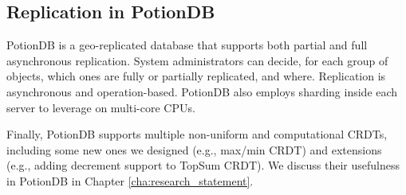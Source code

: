\subsection{Replication in PotionDB}

PotionDB is a geo-replicated database that supports both partial and full asynchronous replication.
System administrators can decide, for each group of objects, which ones are fully or partially replicated, and where.
Replication is asynchronous and operation-based.
PotionDB also employs sharding inside each server to leverage on multi-core CPUs.

Finally, PotionDB supports multiple non-uniform and computational CRDTs, including some new ones we designed (e.g., max/min CRDT) and extensions (e.g., adding decrement support to TopSum CRDT).
We discuss their usefulness in PotionDB in Chapter \ref{cha:research_statement}. 



 






